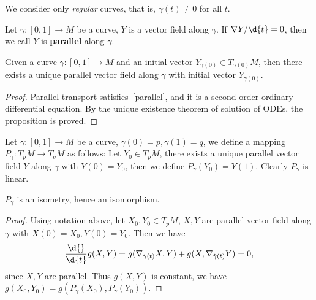 \begin{rem}
    We consider only \emph{regular} curves, that is, $\dot\gamma(t)\neq 0$ for all $t$.
\end{rem}

\begin{defn}
    Let $\gamma:[0,1]\to M$ be a curve, $Y$ is a vector field along $\gamma$.
    If $\nabla Y/\d{t}=0$, then we call $Y$ is \textbf{parallel} along $\gamma$.
\end{defn}

\begin{prop}\label{parallel transport!existence}
    Given a curve $\gamma:[0,1]\to M$ and an initial vector $Y_{\gamma(0)}\in T_{\gamma(0)}M$, then there exists a unique parallel vector field along $\gamma$ with initial vector $Y_{\gamma(0)}$.
\end{prop}
\begin{proof}
    Parallel transport satisfies~\eqref{parallel}, and it is a second order ordinary differential equation.
    By the unique existence theorem of solution of ODEs, the proposition is proved.
\end{proof}

\begin{defn}
    Let $\gamma:[0,1]\to M$ be a curve, $\gamma(0)=p,\gamma(1)=q$, we define a mapping $P_\gamma:T_pM\to T_qM$ as follows:
    Let $Y_0\in T_pM$, there exists a unique parallel vector field $Y$ along $\gamma$ with $Y(0)=Y_0$, then we define $P_\gamma(Y_0)=Y(1)$.
    Clearly $P_\gamma$ is linear.
\end{defn}

\begin{prop}
    $P_\gamma$ is an isometry, hence an isomorphism.
\end{prop}
\begin{proof}
    Using notation above, let $X_0,Y_0\in T_pM$, $X,Y$ are parallel vector field along $\gamma$ with $X(0)=X_0,Y(0)=Y_0$.
    Then we have
    \[\frac{\d{}}{\d{t}}g(X,Y)=g(\nabla_{\dot{\gamma}(t)}X,Y)+g(X,\nabla_{\dot{\gamma}(t)}Y)=0,\]
    since $X,Y$ are parallel.
    Thus $g(X,Y)$ is constant, we have $g(X_0,Y_0)=g(P_\gamma(X_0),P_\gamma(Y_0))$.
\end{proof}

